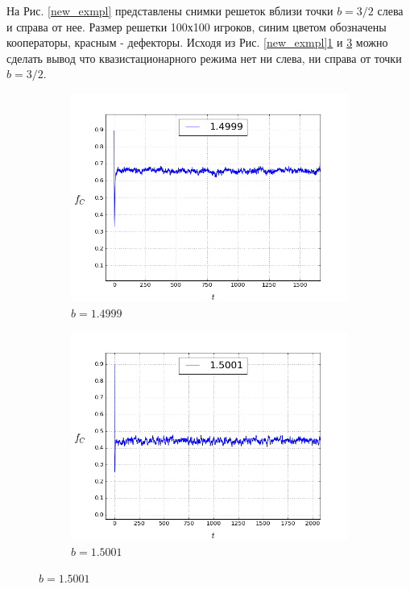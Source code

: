 \documentclass[12pt,a4paper]{article}
\begin{document}
	
	\par На Рис. \ref{new_exmpl} представлены снимки решеток вблизи точки $b=3/2$ слева и справа от нее. Размер решетки 100х100 игроков, синим цветом обозначены кооператоры, красным - дефекторы. Исходя из Рис. \ref{new_exmpl}\ref{newf_left} и \ref{newf_right} можно сделать вывод что квазистационарного режима нет ни слева, ни справа от точки $b=3/2$.
	\begin{figure}[H]
		\centering
		\begin{subfigure}{.5\textwidth}
			\includegraphics[width=1\linewidth]{f1.4999.png}
			\caption{$b=1.4999$}
			\label{newf_left}
		\end{subfigure}%
		\begin{subfigure}{.5\textwidth}
			\includegraphics[width=1\linewidth]{f1.5001.png}
			\caption{$b=1.5001$}
			\label{newf_right}			
		\end{subfigure}%
	

\end{figure}
\end{document}
